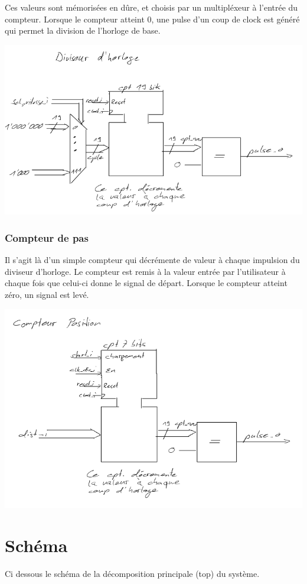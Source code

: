 \documentclass[10pt,a4paper]{article}
\begin{document}
Ces valeurs sont mémorisées en dûre, et choisis par un multipléxeur à l'entrée du compteur.
Lorsque le compteur atteint 0, une pulse d'un coup de clock est généré qui permet la division de l'horloge de base.

\includegraphics[width=\textwidth]{images/div_h.png}
\subsubsection{Compteur de pas}
Il s'agit là d'un simple compteur qui décrémente de valeur à chaque impulsion du diviseur d'horloge.
Le compteur est remis à la valeur entrée par l'utilisateur à chaque fois que celui-ci donne le signal de départ.
Lorsque le compteur atteint zéro, un signal est levé.

\includegraphics[width=\textwidth]{images/cpt_pos.png}
\newpage
\section{Schéma}
Ci dessous le schéma de la décomposition principale (top) du système.
\end{document}
